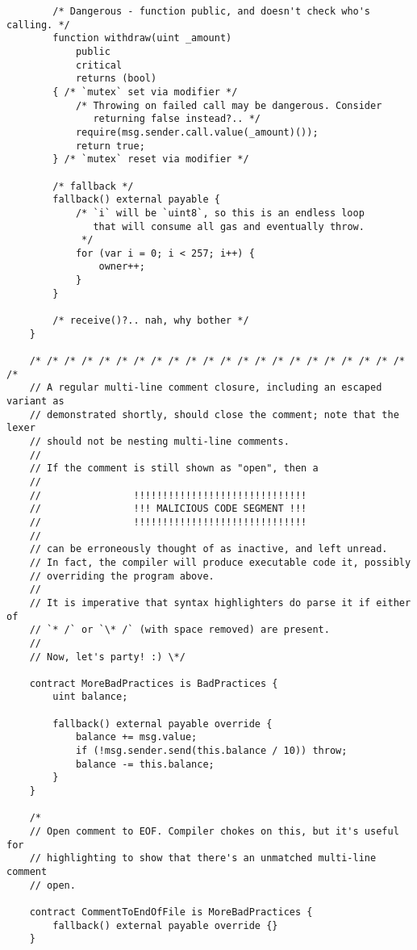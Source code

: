\documentclass[runningheads]{llncs}
\begin{document}
\begin{verbatim}
        /* Dangerous - function public, and doesn't check who's calling. */
        function withdraw(uint _amount)
            public
            critical
            returns (bool)
        { /* `mutex` set via modifier */
            /* Throwing on failed call may be dangerous. Consider
               returning false instead?.. */
            require(msg.sender.call.value(_amount)());
            return true;
        } /* `mutex` reset via modifier */
        
        /* fallback */
        fallback() external payable {
            /* `i` will be `uint8`, so this is an endless loop
               that will consume all gas and eventually throw.
             */
            for (var i = 0; i < 257; i++) {
                owner++;
            }
        }
    
        /* receive()?.. nah, why bother */
    }
    
    /* /* /* /* /* /* /* /* /* /* /* /* /* /* /* /* /* /* /* /* /* /* /*
    // A regular multi-line comment closure, including an escaped variant as
    // demonstrated shortly, should close the comment; note that the lexer
    // should not be nesting multi-line comments.
    //
    // If the comment is still shown as "open", then a
    //
    //                !!!!!!!!!!!!!!!!!!!!!!!!!!!!!!
    //                !!! MALICIOUS CODE SEGMENT !!!
    //                !!!!!!!!!!!!!!!!!!!!!!!!!!!!!!
    //
    // can be erroneously thought of as inactive, and left unread.
    // In fact, the compiler will produce executable code it, possibly
    // overriding the program above.
    //
    // It is imperative that syntax highlighters do parse it if either of
    // `* /` or `\* /` (with space removed) are present.
    //
    // Now, let's party! :) \*/
    
    contract MoreBadPractices is BadPractices {
        uint balance;
    
        fallback() external payable override {
            balance += msg.value;
            if (!msg.sender.send(this.balance / 10)) throw;
            balance -= this.balance;
        }
    }
    
    /*
    // Open comment to EOF. Compiler chokes on this, but it's useful for
    // highlighting to show that there's an unmatched multi-line comment
    // open.
    
    contract CommentToEndOfFile is MoreBadPractices {
        fallback() external payable override {}
    }
    
\end{verbatim}
\newpage
\end{document}
